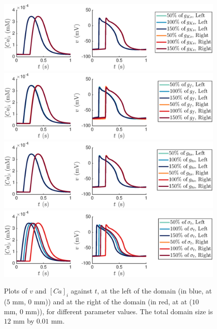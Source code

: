 \documentclass[12pt,a4paper]{article}
\begin{document}
\begin{figure}
   \includegraphics[trim=3cm 0cm 4cm 0cm, clip=true, width=1\linewidth]{strip_gks} 
   \includegraphics[trim=3cm 0cm 4cm 0cm, clip=true, width=1\linewidth]{strip_gf} 
      \includegraphics[trim=3cm 0cm 4cm 0cm, clip=true, width=1\linewidth]{strip_gto} 
         \includegraphics[trim=3cm 0cm 4cm 0cm, clip=true, width=1\linewidth]{strip_sigmat} 
    \caption{Plots of $v$ and $[Ca]_i$ against $t$, at the left of the domain (in blue, at ($5$ mm, $0$ mm)) and at the right of the domain (in red, at at ($10$ mm, $0$ mm)), for different parameter values. The total domain size is $12$ mm by $0.01$ mm.}
    \label{fig:5}
\end{figure}
%
\end{document}
